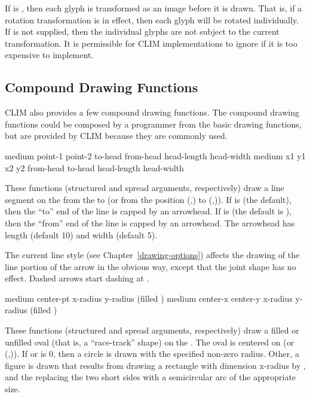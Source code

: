 If  is , then each glyph is transformed as an
image before it is drawn.  That is, if a rotation transformation is in effect,
then each glyph will be rotated individually.  If  is not
supplied, then the individual glyphs are not subject to the current
transformation.  It is permissible for CLIM implementations to ignore
 if it is too expensive to implement.


\subsection {Compound Drawing Functions}

CLIM also provides a few compound drawing functions.  The compound drawing
functions could be composed by a programmer from the basic drawing functions,
but are provided by CLIM because they are commonly used.

  {medium point-1 point-2 \key \DrawingOptions \LineCapOptions
                      to-head from-head head-length head-width}
 {medium x1 y1 x2 y2 \key \DrawingOptions \LineCapOptions
                      from-head to-head head-length head-width}

These functions (structured and spread arguments, respectively) draw a line
segment on the   from the   to
 (or from the position (,) to (,)).
If  is  (the default), then the ``to'' end of the line
is capped by an arrowhead.  If  is  (the default is
), then the ``from'' end of the line is capped by an arrowhead.  The
arrowhead has length  (default 10) and width 
(default 5).

The current line style (see Chapter~\ref{drawing-options}) affects the drawing
of the line portion of the arrow in the obvious way, except that the joint shape
has no effect.  Dashed arrows start dashing at .


  {medium center-pt x-radius y-radius \key (filled ) 
                     \DrawingOptions \LineCapOptions}
 {medium center-x center-y x-radius y-radius \key (filled )
                     \DrawingOptions \LineCapOptions}

These functions (structured and spread arguments, respectively) draw a filled or
unfilled oval (that is, a ``race-track'' shape) on the  .
The oval is centered on  (or (,)).
If  or  is $0$, then a circle is drawn with the
specified non-zero radius.  Other, a figure is drawn that results from drawing a
rectangle with dimension {x-radius} by , and the replacing the two
short sides with a semicircular arc of the appropriate size.


